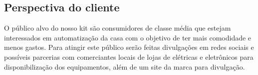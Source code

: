         \subsection{Perspectiva do cliente}
            \par O público alvo do nosso kit são consumidores de classe média que estejam interessados em automatização da casa com o objetivo de ter mais comodidade e menos gastos. Para atingir este público serão feitas divulgações em redes sociais e possíveis parcerias com comerciantes locais de lojas de elétricas e eletrônicos para disponibilização dos equipamentos, além de um site da marca para divulgação.
